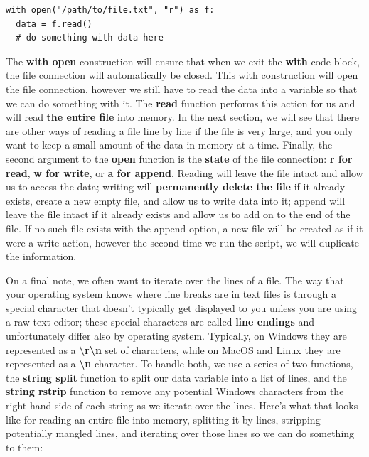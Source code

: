 \documentclass[a4paper,11pt]{article}
\begin{document}
\vspace{3mm}
\begin{lstlisting}
with open("/path/to/file.txt", "r") as f:
  data = f.read()
  # do something with data here
\end{lstlisting}
\vspace{3mm}

The \textbf{with open} construction will ensure that when we exit the \textbf{with} code block, the 
file connection will automatically be closed.  This with construction will open the file connection, 
however we still have to read the data into a variable so that we can do something with it.  The 
\textbf{read} function performs this action for us and will read \textbf{the entire file} into 
memory.  In the next section, we will see that there are other ways of reading a file line by line 
if the file is very large, and you only want to keep a small amount of the data in memory at a time.  
Finally, the second argument to the \textbf{open} function is the \textbf{state} of the file connection: 
\textbf{r for read}, \textbf{w for write}, or \textbf{a for append}.  Reading will leave the file intact 
and allow us to access the data; writing will \textbf{permanently delete the file} if it already exists, 
create a new empty file, and allow us to write data into it; append will leave the file intact
if it already exists and allow 
us to add on to the end of the file.  If no such file exists with the append option, a new file will be 
created as if it were a write action, however the second time we run the script, we will duplicate the 
information.  \par 

On a final note, we often want to iterate over the lines of a file.  The way that your operating system 
knows where line breaks are in text files is through a special character that doesn't typically get 
displayed to you unless you are using a raw text editor; these special characters are called 
\textbf{line endings} and unfortunately differ also by operating system.  Typically, on Windows 
they are represented as a \textbf{\textbackslash{}r\textbackslash{}n} set of characters, while on MacOS and Linux they are 
represented as a \textbf{\textbackslash{}n} character.  To handle both, we use a series of two functions, 
the \textbf{string split} function to split our data variable into a list of lines, and the 
\textbf{string rstrip} function to remove any potential Windows characters from the right-hand 
side of each string as we iterate over the lines.  Here's what that looks like for reading an 
entire file into memory, splitting it by lines, stripping potentially mangled lines, and iterating 
over those lines so we can do something to them:
\end{document}
